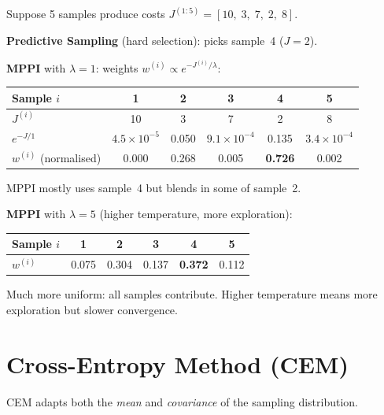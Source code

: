 \documentclass[11pt,twoside]{report}
\theoremstyle{definition}
\theoremstyle{plain}
\theoremstyle{remark}
\newcommand{\0}{\bm{0}}
\begin{document}
\begin{examplebox}
Suppose 5 samples produce costs $J^{(1:5)}=[10,\;3,\;7,\;2,\;8]$.

\textbf{Predictive Sampling} (hard selection): picks sample~4 ($J=2$).

\textbf{MPPI} with $\lambda=1$: weights $w^{(i)}\propto e^{-J^{(i)}/\lambda}$:
\begin{center}
\begin{tabular}{lccccc}
\toprule
Sample $i$ & 1 & 2 & 3 & 4 & 5\\
\midrule
$J^{(i)}$ & 10 & 3 & 7 & 2 & 8\\
$e^{-J/1}$ & $4.5\!\times\!10^{-5}$ & 0.050 & $9.1\!\times\!10^{-4}$ & 0.135 & $3.4\!\times\!10^{-4}$\\
$w^{(i)}$ (normalised) & 0.000 & 0.268 & 0.005 & \textbf{0.726} & 0.002\\
\bottomrule
\end{tabular}
\end{center}
MPPI mostly uses sample~4 but blends in some of sample~2.

\textbf{MPPI} with $\lambda=5$ (higher temperature, more exploration):
\begin{center}
\begin{tabular}{lccccc}
\toprule
Sample $i$ & 1 & 2 & 3 & 4 & 5\\
\midrule
$w^{(i)}$ & 0.075 & 0.304 & 0.137 & \textbf{0.372} & 0.112\\
\bottomrule
\end{tabular}
\end{center}
Much more uniform: all samples contribute. Higher temperature means more exploration but slower convergence.
\end{examplebox}

\section{Cross-Entropy Method (CEM)}
\label{sec:cem}

CEM adapts both the \emph{mean} and \emph{covariance} of the sampling
distribution.

\begin{algorithm}[H]
\caption{Cross-Entropy Method}\label{alg:cem}
\end{algorithm}
\end{document}
